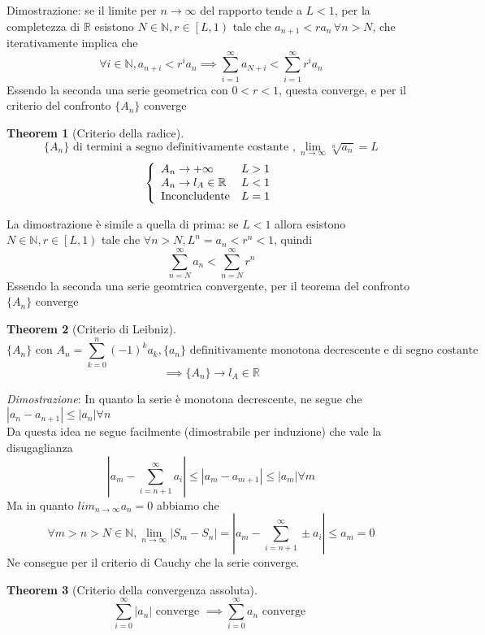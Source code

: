 \documentclass{article}
\newtheorem{theorem}{Theorem}[section]
\begin{document}
        Dimostrazione: se il limite per $n \to \infty$ del rapporto tende a $L < 1$, 
        per la completezza di $\mathbb{R}$ esistono $N \in \mathbb{N}, r \in \left[\left.L, 1\right)\right.$
        tale che $a_{n+1} < ra_n \, \forall n > N$, che iterativamente implica che 
        $$\forall i \in \mathbb{N}, a_{n+i} < r^ia_n \implies \sum_{i=1}^\infty a_{N+i} < \sum_{i=1}^\infty r^ia_n$$
        Essendo la seconda una serie geometrica con $0 < r < 1$, questa converge, e per il criterio del confronto 
        $\{A_n\}$ converge
        \begin{theorem}[Criterio della radice]
            $$\{A_n\} \textrm{ di termini a segno definitivamente costante }, \lim_{n \to \infty}\sqrt[n]{a_n} = L$$
            \begin{equation}
                \left\{\begin{array}{l l}
                    A_n \to +\infty & L > 1 \\
                    A_n \to l_A \in \mathbb{R} & L < 1 \\
                    \textrm{Inconcludente} & L = 1 \\
                \end{array}\right.
            \end{equation}
        \end{theorem}
        La dimostrazione è simile a quella di prima: se $L < 1$ allora 
        esistono $N \in \mathbb{N}, r \in \left[\left.L, 1\right)\right.$ tale che 
        $\forall n > N, L^n = a_n < r^n < 1$, quindi 
        $$\sum_{n = N}^\infty a_n < \sum_{n=N}^\infty r^n$$ Essendo la 
        seconda una serie geomtrica convergente, per il teorema del confronto $\{A_n\}$ converge
    \begin{theorem}[Criterio di Leibniz]
        $$\{A_n\} \textrm{ con } A_n = \sum_{k=0}^n \left(-1\right)^ka_k, \{a_n\} \textrm{ definitivamente monotona decrescente e di segno costante }$$
        $$\implies \{A_n\} \to l_A \in \mathbb{R}$$
    \end{theorem}
    \textit{Dimostrazione}:
        In quanto la serie è monotona decrescente, ne segue che $|a_n - a_{n+1}| \leq |a_n| \forall n$ \\
        Da questa idea ne segue facilmente (dimostrabile per induzione) che vale la disugaglianza
        $$|a_m - \sum_{i = n+1}^{\infty} a_i| \leq |a_m - a_{m+1}| \leq |a_m| \forall m$$
        Ma in quanto $lim_{n \to \infty} a_n = 0$ abbiamo che 
        $$\forall m > n > N \in \mathbb{N}, \lim_{n \to \infty} |S_m - S_n| = |a_m - \sum_{i=n+1}^\infty \pm a_i| \leq a_m = 0$$
        Ne consegue per il criterio di Cauchy che la serie converge.
    \begin{theorem}[Criterio della convergenza assoluta]
        $$\sum_{i=0}^\infty |a_n| \textrm{ converge } \implies \sum_{i=0}^\infty a_n \textrm{ converge }$$
    \end{theorem}
\end{document}
